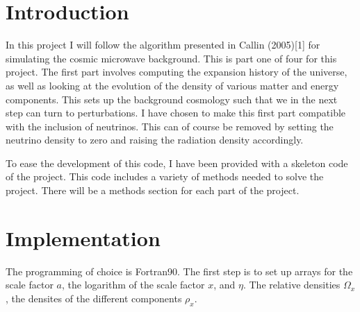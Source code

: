 \documentclass{aa}   %
\begin{document}
  


\section{Introduction}\label{sec:introduction}
In this project I will follow the algorithm presented in Callin (2005)[1] for simulating the cosmic microwave background.  
This is part one of four for this project.
The first part involves computing the expansion history of the universe, as well as looking at the evolution of the density of various matter and energy components. This sets up the background cosmology such that we in the next step can turn to perturbations.
I have chosen to make this first part compatible with the inclusion of neutrinos.
This can of course be removed by setting the neutrino density to zero and raising the radiation density accordingly.

To ease the development of this code, I have been provided with a skeleton code of the project. 
This code includes a variety of methods needed to solve the project. There will be a methods section for each part of the project.
\section{Implementation}\label{sec:Imp}
The programming of choice is Fortran90. 
The first step is to set up arrays for the scale factor $a$, the logarithm of the scale factor $x$, and $\eta$. The relative densities $\Omega_x$, the densites of the different components $\rho_x$.
\end{document}
